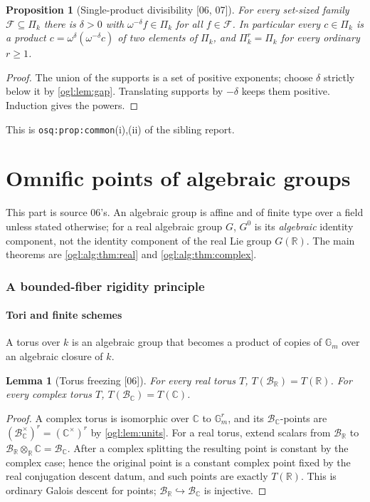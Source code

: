 \documentclass[11pt,oneside]{article}
\numberwithin{equation}{section}
\newtheorem{proposition}[proposition]{Proposition}
\newtheorem{lemma}[lemma]{Lemma}
\theoremstyle{definition}
\theoremstyle{remark}
\newcommand{\R}{\mathbb R}
\newcommand{\C}{\mathbb C}
\newcommand{\BR}{\mathcal B_{\R}}
\newcommand{\BC}{\mathcal B_{\C}}
\newcommand{\Gm}{\mathbb G_m}
\newcommand{\src}[1]{\textup{\textsf{\small[#1]}}}
\newcommand{\replabel}[1]{\nolinkurl{#1}}
\begin{document}
\begin{proposition}[Single-product divisibility \src{06, 07}]\label{ogl:prop:factor}
For every set-sized family $\mathcal F\subseteq\Pi_k$ there is $\delta>0$ with
$\omega^{-\delta}f\in\Pi_k$ for all $f\in\mathcal F$. In particular every
$c\in\Pi_k$ is a product $c=\omega^\delta(\omega^{-\delta}c)$ of two elements
of $\Pi_k$, and $\Pi_k^r=\Pi_k$ for every ordinary $r\ge1$.
\end{proposition}
\begin{proof}
The union of the supports is a set of positive exponents; choose $\delta$
strictly below it by \cref{ogl:lem:gap}. Translating supports by $-\delta$
keeps them positive. Induction gives the powers.
\end{proof}

This is \replabel{osq:prop:common}(i),(ii) of the sibling report.
\part{Omnific points of algebraic groups}\label{ogl:alg:part}

This part is source 06's. An algebraic group is affine and of finite type over
a field unless stated otherwise; for a real algebraic group $G$, $G^0$ is its
\emph{algebraic} identity component, not the identity component of the real
Lie group $G(\R)$. The main theorems are \cref{ogl:alg:thm:real} and
\cref{ogl:alg:thm:complex}.

\section{A bounded-fiber rigidity principle}\label{ogl:alg:sec:fibers}

\subsection{Tori and finite schemes}
A torus over $k$ is an algebraic group that becomes a product of copies of
$\Gm$ over an algebraic closure of $k$.

\begin{lemma}[Torus freezing \src{06}]\label{ogl:alg:lem:torus}
For every real torus $T$, $T(\BR)=T(\R)$. For every complex torus $T$,
$T(\BC)=T(\C)$.
\end{lemma}
\begin{proof}
A complex torus is isomorphic over $\C$ to $\Gm^r$, and its $\BC$-points are
$(\BC^\times)^r=(\C^\times)^r$ by \cref{ogl:lem:units}. For a real torus,
extend scalars from $\BR$ to $\BR\otimes_\R\C=\BC$. After a complex splitting
the resulting point is constant by the complex case; hence the original point
is a constant complex point fixed by the real conjugation descent datum, and
such points are exactly $T(\R)$. This is ordinary Galois descent for points;
$\BR\hookrightarrow\BC$ is injective.
\end{proof}
\end{document}
